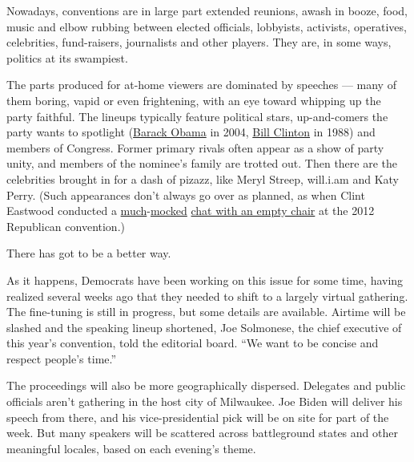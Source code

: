 Nowadays, conventions are in large part extended reunions, awash in
booze, food, music and elbow rubbing between elected officials,
lobbyists, activists, operatives, celebrities, fund-raisers, journalists
and other players. They are, in some ways, politics at its swampiest.

The parts produced for at-home viewers are dominated by speeches ---
many of them boring, vapid or even frightening, with an eye toward
whipping up the party faithful. The lineups typically feature political
stars, up-and-comers the party wants to spotlight
(\href{https://www.nytimes.com/2004/07/27/politics/campaign/barack-obamas-remarks-to-the-democratic-national.html}{Barack
Obama} in 2004,
\href{https://www.vox.com/2016/7/26/12285312/bill-clinton-dnc-1988-speaker-late-night}{Bill
Clinton} in 1988) and members of Congress. Former primary rivals often
appear as a show of party unity, and members of the nominee's family are
trotted out. Then there are the celebrities brought in for a dash of
pizazz, like Meryl Streep, will.i.am and Katy Perry. (Such appearances
don't always go over as planned, as when Clint Eastwood conducted a
\href{https://www.washingtonpost.com/news/morning-mix/wp/2016/08/04/clint-eastwood-explains-and-regrets-his-speech-to-an-empty-chair/}{much}-\href{https://www.washingtonpost.com/blogs/compost/post/clint-eastwood-delivers-greatest-speech-in-us-history-mitt-romney-also-there/2012/08/31/cd8485fe-f320-11e1-adc6-87dfa8eff430_blog.html?itid=lk_inline_manual_6}{mocked}
\href{https://www.nytimes.com/video/us/politics/100000001752472/clint-eastwoods-rnc-speech.html}{chat
with an empty chair} at the 2012 Republican convention.)

There has got to be a better way.

As it happens, Democrats have been working on this issue for some time,
having realized several weeks ago that they needed to shift to a largely
virtual gathering. The fine-tuning is still in progress, but some
details are available. Airtime will be slashed and the speaking lineup
shortened, Joe Solmonese, the chief executive of this year's convention,
told the editorial board. ``We want to be concise and respect people's
time.''

The proceedings will also be more geographically dispersed. Delegates
and public officials aren't gathering in the host city of Milwaukee. Joe
Biden will deliver his speech from there, and his vice-presidential pick
will be on site for part of the week. But many speakers will be
scattered across battleground states and other meaningful locales, based
on each evening's theme.

